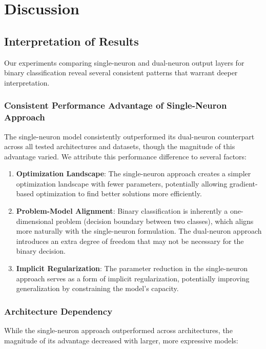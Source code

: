 \section{Discussion}

\subsection{Interpretation of Results}

Our experiments comparing single-neuron and dual-neuron output layers for binary classification reveal several consistent patterns that warrant deeper interpretation.

\subsubsection{Consistent Performance Advantage of Single-Neuron Approach}

The single-neuron model consistently outperformed its dual-neuron counterpart across all tested architectures and datasets, though the magnitude of this advantage varied. We attribute this performance difference to several factors:

\begin{enumerate}
\item \textbf{Optimization Landscape}: The single-neuron approach creates a simpler optimization landscape with fewer parameters, potentially allowing gradient-based optimization to find better solutions more efficiently.

\item \textbf{Problem-Model Alignment}: Binary classification is inherently a one-dimensional problem (decision boundary between two classes), which aligns more naturally with the single-neuron formulation. The dual-neuron approach introduces an extra degree of freedom that may not be necessary for the binary decision.

\item \textbf{Implicit Regularization}: The parameter reduction in the single-neuron approach serves as a form of implicit regularization, potentially improving generalization by constraining the model's capacity.
\end{enumerate}

\subsubsection{Architecture Dependency}

While the single-neuron approach outperformed across architectures, the magnitude of its advantage decreased with larger, more expressive models:

